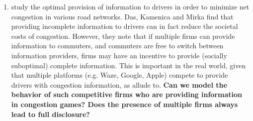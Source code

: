 \documentclass[JEL]{AEA}
\begin{document}
\begin{enumerate}
\item \cite{das-2017} study the optimal provision of information to drivers in order to minimize net congestion in various road networks. Das, Kamenica and Mirka find that providing incomplete information to drivers can in fact reduce the societal costs of congestion. However, they note that if multiple firms can provide information to commuters, and commuters are free to switch between information providers, firms may have an incentive to provide (socially suboptimal) complete information. This is important in the real world, given that multiple platforms (e.g. Waze, Google, Apple) compete to provide drivers with congestion information, as \cite{ostrovsky-2018} allude to. \textbf{Can we model the behavior of such competitive firms who are providing information in congestion games? Does the presence of multiple firms always lead to full disclosure?}

\end{enumerate}






\end{document}
